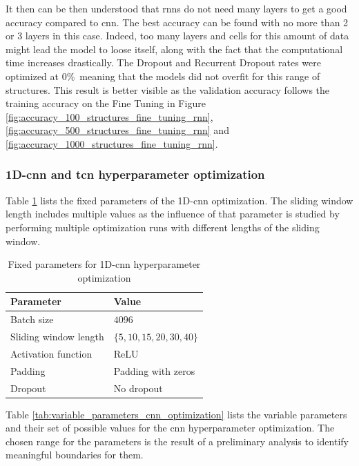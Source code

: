 \documentclass[conference]{IEEEtran}
\begin{document}
It then can be then understood that \glspl{rnn} do not need many layers to get a good accuracy compared to \gls{cnn}. The best accuracy can be found with no more than 2 or 3 layers in this case. Indeed, too many layers and cells for this amount of data might lead the model to loose itself, along with the fact that the computational time increases drastically. The Dropout and Recurrent Dropout rates were optimized at 0\%\ meaning that the models did not overfit for this range of structures. This result is better visible as the validation accuracy follows the training accuracy on the Fine Tuning in Figure \ref{fig:accuracy_100_structures_fine_tuning_rnn}, \ref{fig:accuracy_500_structures_fine_tuning_rnn} and \ref{fig:accuracy_1000_structures_fine_tuning_rnn}.

\subsubsection{1D-\gls{cnn} and \gls{tcn} hyperparameter optimization}
\label{sec:cnn_hyperparameter_optimization}

Table \ref{tab:fixed_parameters_cnn_optimization} lists the fixed parameters of the 1D-\gls{cnn} optimization. The sliding window length includes multiple values as the influence of that parameter is studied by performing multiple optimization runs with different lengths of the sliding window.

\begin{table}[htp]
	\centering
	\caption{Fixed parameters for 1D-\gls{cnn} hyperparameter optimization}
	\label{tab:fixed_parameters_cnn_optimization}
	\begin{tabular}{ll}
		\textbf{Parameter} & \textbf{Value} \\
		\hline
		Batch size & $ 4096 $ \\
		Sliding window length & $ \{5, 10, 15, 20, 30, 40\} $ \\
		Activation function & ReLU \\
		Padding & Padding with zeros \\
		Dropout & No dropout
	\end{tabular}
\end{table}

Table \ref{tab:variable_parameters_cnn_optimization} lists the variable parameters and their set of possible values for the \gls{cnn} hyperparameter optimization. The chosen range for the parameters is the result of a preliminary analysis to identify meaningful boundaries for them.
\end{document}
